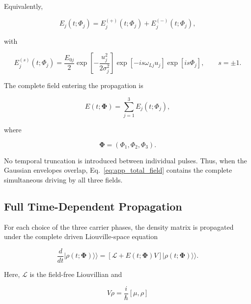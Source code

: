 \documentclass[11pt]{article}
\begin{document}
Equivalently,

\begin{equation}
E_j(t;\Phi_j)
=
E_j^{(+)}(t;\Phi_j)
+
E_j^{(-)}(t;\Phi_j),
\end{equation}

with

\begin{equation}
E_j^{(s)}(t;\Phi_j)
=
\frac{E_{0j}}{2}
\exp
\left[
-\frac{u_j^2}{2\sigma_j^2}
\right]
\exp
\left[
-is\omega_{Lj}u_j
\right]
\exp
\left[
is\Phi_j
\right],
\qquad
s=\pm1.
\label{eq:app_field_components}
\end{equation}

The complete field entering the propagation is

\begin{equation}
\boxed{
E(t;\boldsymbol{\Phi})
=
\sum_{j=1}^{3}
E_j(t;\Phi_j),
}
\label{eq:app_total_field}
\end{equation}

where

\begin{equation}
\boldsymbol{\Phi}
=
(\Phi_1,\Phi_2,\Phi_3).
\end{equation}

No temporal truncation is introduced between individual pulses.  Thus,
when the Gaussian envelopes overlap, Eq.~\eqref{eq:app_total_field}
contains the complete simultaneous driving by all three fields.


\subsection{Full Time-Dependent Propagation}
\label{app:full_three_pulse_propagation}

For each choice of the three carrier phases, the density matrix is
propagated under the complete driven Liouville-space equation

\begin{equation}
\boxed{
\frac{d}{dt}
|\rho(t;\boldsymbol{\Phi})\rangle\rangle
=
\left[
\mathcal{L}
+
E(t;\boldsymbol{\Phi})V
\right]
|\rho(t;\boldsymbol{\Phi})\rangle\rangle .
}
\label{eq:app_full_driven_ode}
\end{equation}

Here, $\mathcal{L}$ is the field-free Liouvillian and

\begin{equation}
V\rho
=
\frac{i}{\hbar}
[\mu,\rho]
\end{equation}
\end{document}
